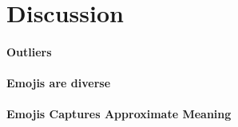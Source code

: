 \section{Discussion}

\paragraph{Outliers} 

\paragraph{Emojis are diverse} 

\paragraph{Emojis Captures Approximate Meaning} 


